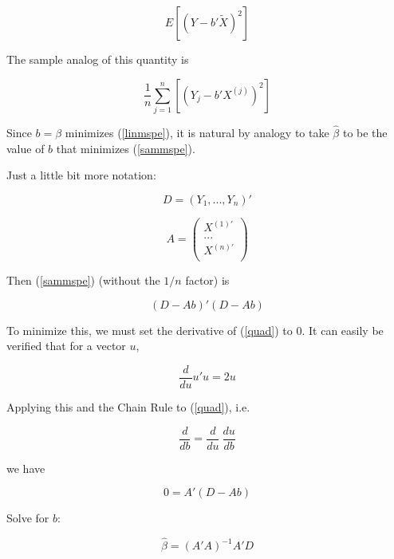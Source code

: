 \begin{equation}
\label{linmspe}
E \left [ (Y - b' \widetilde{X})^2 \right ]
\end{equation}

The sample analog of this quantity is

\begin{equation}
\label{sammspe}
\frac{1}{n}
\sum_{j=1}^n \left [ (Y_j - b' X^{(j)})^2 \right ]
\end{equation}

Since $b = \beta$ minimizes (\ref{linmspe}), it is natural by analogy to
take $\widehat{\beta}$ to be the value of $b$ that minimizes
(\ref{sammspe}).

Just a little bit more notation:

\begin{equation}
D = (Y_1,...,Y_n)'
\end{equation}

\begin{equation}
A = 
\left (
\begin{array}{r}
X^{(1)'} \\
... \\
X^{(n)'} \\
\end{array}
\right )
\end{equation}

Then (\ref{sammspe}) (without the $1/n$ factor) is

\begin{equation}
\label{quad}
(D - Ab)'(D - Ab)
\end{equation}

To minimize this, we must set the derivative of (\ref{quad}) to 0.  It
can easily be verified that for a vector $u$, 

\begin{equation}
\frac{d}{du} u'u = 2u
\end{equation}

Applying this and the Chain Rule to (\ref{quad}), i.e.

\begin{equation}
\frac{d}{db} = \frac{d}{du} ~ \frac{du}{db}
\end{equation}


we have

\begin{equation}
0 = A' (D - Ab) 
\end{equation}

Solve for $b$:

\begin{equation}
\label{ols}
\widehat{\beta} = (A'A)^{-1} A'D
\end{equation}

